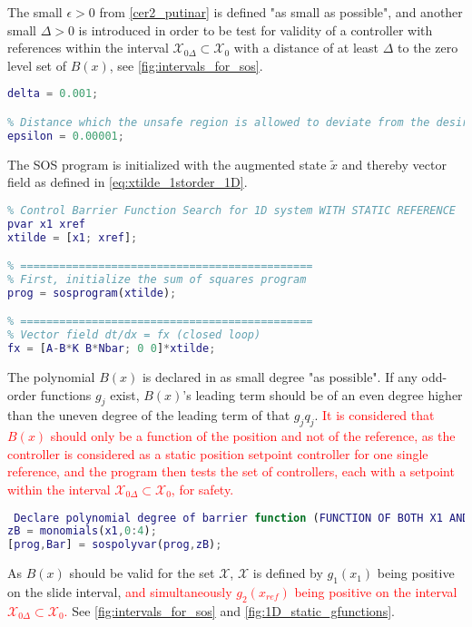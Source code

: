 The small $\epsilon>0$ from \autoref{cer2_putinar} is defined "as small as possible", and another small $\Delta>0$ is introduced in order to be test for validity of a controller with references within the interval $\mathcal{X}_{0\Delta} \subset \mathcal{X}_0$ with a distance of at least $\Delta$ to the zero level set of $B(x)$, see \autoref{fig:intervals_for_sos}.
\begin{lstlisting}[language=matlab]
% Distance reference should keep to the unsafe region
delta = 0.001;

% Distance which the unsafe region is allowed to deviate from the desired zero level set specified by the g(x) defining Xu
epsilon = 0.00001;
\end{lstlisting}
The SOS program is initialized with the augmented state $\tilde{x}$ and thereby vector field as defined in \autoref{eq:xtilde_1storder_1D}. 
\begin{lstlisting}[language=matlab]
% =============================================
% Control Barrier Function Search for 1D system WITH STATIC REFERENCE
pvar x1 xref
xtilde = [x1; xref];

% =============================================
% First, initialize the sum of squares program
prog = sosprogram(xtilde);

% =============================================
% Vector field dt/dx = fx (closed loop)
fx = [A-B*K B*Nbar; 0 0]*xtilde;
\end{lstlisting}
The polynomial $B(x)$ is declared in as small degree "as possible". If any odd-order functions $g_j$ exist, $B(x)$'s leading term should be of an even degree higher than the uneven degree of the leading term of that $g_jq_j$. \textcolor{red}{It is considered that $B(x)$ should only be a function of the position and not of the reference, as the controller is considered as a static position setpoint controller for one single reference, and the program then tests the set of controllers, each with a setpoint within the interval $\mathcal{X}_{0\Delta} \subset \mathcal{X}_0$, for safety.}
\begin{lstlisting}[language=matlab]
% =============================================
 Declare polynomial degree of barrier function (FUNCTION OF BOTH X1 AND XREF?)
zB = monomials(x1,0:4);
[prog,Bar] = sospolyvar(prog,zB);
\end{lstlisting}
As $B(x)$ should be valid for the set $\mathcal{X}$, $\mathcal{X}$ is defined by $g_1(x_1)$ being positive on the slide interval, \textcolor{red}{and simultaneously $g_2(x_{ref})$ being positive on the interval $\mathcal{X}_{0\Delta} \subset \mathcal{X}_0$.} See \autoref{fig:intervals_for_sos} and \ref{fig:1D_static_gfunctions}.

